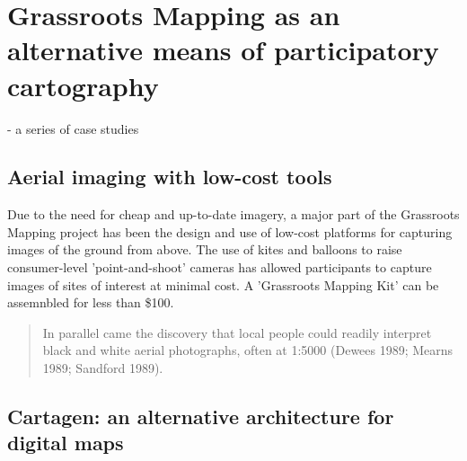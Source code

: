 \documentclass[11pt]{report}
\begin{document}
\chapter{Grassroots Mapping as an alternative means of participatory cartography}

		- a series of case studies

\section{Aerial imaging with low-cost tools}

Due to the need for cheap and up-to-date imagery, a major part of the Grassroots Mapping project has been the design and use of low-cost platforms for capturing images of the ground from above. The use of kites and balloons to raise consumer-level 'point-and-shoot' cameras has allowed participants to capture images of sites of interest at minimal cost. A 'Grassroots Mapping Kit' can be assemnbled for less than \$100. 

\begin{quote}
In parallel came the discovery that local people could readily interpret black and white aerial photographs, often at 1:5000 (Dewees 1989; Mearns 1989; Sandford 1989). 
\cite{chambers2006participatory}
\end{quote}

\section{Cartagen: an alternative architecture for digital maps}
\end{document}

